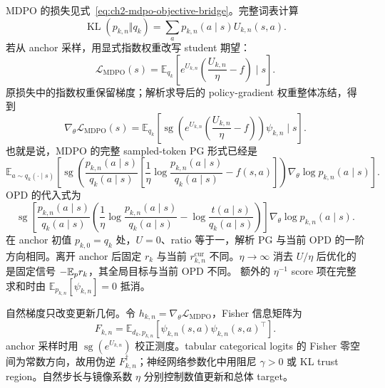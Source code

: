 MDPO 的损失见式~\eqref{eq:ch2-mdpo-objective-bridge}。完整词表计算
\begin{equation}
\operatorname{KL}( p_{k,n}\Vert q_k)
=\sum_a p_{k,n}(a\mid s)U_{k,n}(s,a).
\label{eq:ch2-mdpo-full-kl}
\end{equation}
若从 anchor 采样，用显式指数权重改写 student 期望：
\begin{equation}
\mathcal L_{\mathrm{MDPO}}(s)
=\mathbb E_{ q_k}\left[e^{U_{k,n}}\left(\frac{U_{k,n}}\eta-f\right)\mid s\right].
\label{eq:ch2-mdpo-sample-integrand}
\end{equation}
原损失中的指数权重保留梯度；解析求导后的 policy-gradient 权重整体冻结，得到
\begin{equation}
\nabla_\theta\mathcal L_{\mathrm{MDPO}}(s)
=\mathbb E_{ q_k}\left[\operatorname{sg}\!\left(e^{U_{k,n}}\left(\frac{U_{k,n}}\eta-f\right)\right)\psi_{k,n}\mid s\right].
\label{eq:ch2-mdpo-generic-gradient}
\end{equation}
也就是说，MDPO 的完整 sampled-token PG 形式已经是
\begin{equation}
\label{eq:ch2-mdpo-pg}
\mathbb E_{a\sim q_k(\cdot\mid s)}\left[
\operatorname{sg}\!\left(
\frac{ p_{k,n}(a\mid s)}{ q_k(a\mid s)}
\left[\frac1\eta\log\frac{ p_{k,n}(a\mid s)}{ q_k(a\mid s)}-f(s,a)\right]
\right)\nabla_\theta\log p_{k,n}(a\mid s)\right].
\end{equation}
OPD 的代入式为
\begin{equation}
\label{eq:ch2-mdpo-opd-pg}
\operatorname{sg}\!\left[
\frac{ p_{k,n}(a\mid s)}{ q_k(a\mid s)}
\left(\frac1\eta\log\frac{ p_{k,n}(a\mid s)}{ q_k(a\mid s)}
-\log\frac{ t(a\mid s)}{ q_k(a\mid s)}\right)
\right]\nabla_\theta\log p_{k,n}(a\mid s).
\end{equation}
在 anchor 初值 $p_{k,0}=q_k$ 处，$U=0$、ratio 等于一，解析 PG 与当前 OPD 的一阶方向相同。离开 anchor 后固定 $r_k$ 与当前 $r_{k,n}^{\mathrm{cur}}$ 不同。$\eta\to\infty$ 消去 $U/\eta$ 后优化的是固定信号 $-\mathbb E_p r_k$，其全局目标与当前 OPD 不同。
额外的 $\eta^{-1}$ score 项在完整求和时由 $\mathbb E_{ p_{k,n}}[\psi_{k,n}]=0$ 抵消。

自然梯度只改变更新几何。令 $h_{k,n}=\nabla_\theta\mathcal L_{\mathrm{MDPO}}$，Fisher 信息矩阵为
\begin{equation*}
F_{k,n}=\mathbb E_{d_k, p_{k,n}}[\psi_{k,n}(s,a)\psi_{k,n}(s,a)^\top].
\end{equation*}
anchor 采样时用 $\operatorname{sg}(e^{U_{k,n}})$ 校正测度。tabular categorical logits 的 Fisher 零空间为常数方向，故用伪逆 $F_{k,n}^{\dagger}$；神经网络参数化中用阻尼 $\gamma>0$ 或 KL trust region。自然步长与镜像系数 $\eta$ 分别控制数值更新和总体 target。

